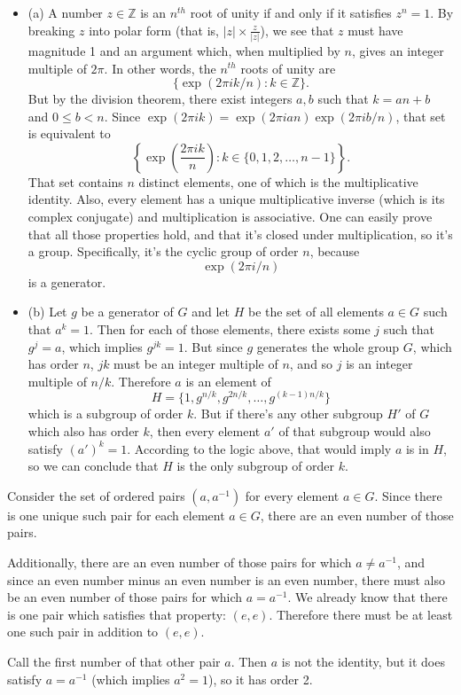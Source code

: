 \documentclass[12pt]{article}
\begin{document}
\begin{itemize}
    \item (a) A number $z \in \mathbb{Z}$ is an $n^{th}$ root of unity if and only if it satisfies $z^n = 1$. By breaking $z$ into polar form (that is, $|z| \times \frac{z}{|z|}$), we see that $z$ must have magnitude 1 and an argument which, when multiplied by $n$, gives an integer multiple of $2 \pi$. In other words, the $n^{th}$ roots of unity are
        \[ \{ \exp{(2 \pi i k / n)} : k \in \mathbb{Z} \}. \]
        But by the division theorem, there exist integers $a,b$ such that $k=an+b$ and $0 \leq b < n$. Since $\exp{(2 \pi i k)} = \exp{(2 \pi i a n)} \exp{(2 \pi i b / n)}$, that set is equivalent to
        \[ \left\{ \exp{\left( \frac{2 \pi i k}{n} \right) } : k \in \{0, 1, 2, \dots, n-1 \} \right\}. \]
        That set contains $n$ distinct elements, one of which is the multiplicative identity. Also, every element has a unique multiplicative inverse (which is its complex conjugate) and multiplication is associative. One can easily prove that all those properties hold, and that it's closed under multiplication, so it's a group. Specifically, it's the cyclic group of order $n$, because
        \[ \exp{(2 \pi i / n)} \]
        is a generator.
    \item (b) Let $g$ be a generator of $G$ and let $H$ be the set of all elements $a \in G$ such that $a^k=1$. Then for each of those elements, there exists some $j$ such that $g^j = a$, which implies $g^{jk} = 1$. But since $g$ generates the whole group $G$, which has order $n$, $jk$ must be an integer multiple of $n$, and so $j$ is an integer multiple of $n/k$. Therefore $a$ is an element of
        \[ H = \{ 1, g^{n/k}, g^{2n/k}, \dots, g^{(k-1)n/k} \} \]
        which is a subgroup of order $k$. But if there's any other subgroup $H'$ of $G$ which also has order $k$, then every element $a'$ of that subgroup would also satisfy $(a')^k=1$. According to the logic above, that would imply $a$ is in $H$, so we can conclude that $H$ is the only subgroup of order $k$.

\end{itemize}

\bigskip
\noindent{}\bigskip

Consider the set of ordered pairs $(a, a^{-1})$ for every element $a \in G$. Since there is one unique such pair for each element $a \in G$, there are an even number of those pairs.
\par
Additionally, there are an even number of those pairs for which $a \neq a^{-1}$, and since an even number minus an even number is an even number, there must also be an even number of those pairs for which $a = a^{-1}$. We already know that there is one pair which satisfies that property: $(e, e)$. Therefore there must be at least one such pair in addition to $(e, e)$.
\par
Call the first number of that other pair $a$. Then $a$ is not the identity, but it does satisfy $a = a^{-1}$ (which implies $a^2 = 1$), so it has order 2.
\end{document}
